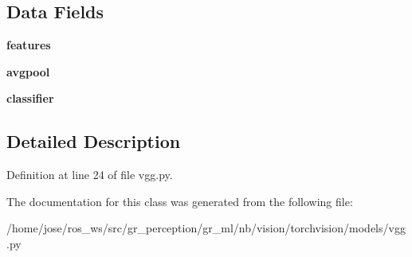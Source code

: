 \subsection*{Data Fields}
\begin{DoxyCompactItemize}
\item 
\mbox{\label{classtorchvision_1_1models_1_1vgg_1_1VGG_acf6b1606f61a6872ae78aa605631b8b4}} 
{\bfseries features}
\item 
\mbox{\label{classtorchvision_1_1models_1_1vgg_1_1VGG_ae55ee2975dba55cc195e5df2cd25a40b}} 
{\bfseries avgpool}
\item 
\mbox{\label{classtorchvision_1_1models_1_1vgg_1_1VGG_a5eadeb22a627ec76105524126766a510}} 
{\bfseries classifier}
\end{DoxyCompactItemize}


\subsection{Detailed Description}


Definition at line 24 of file vgg.\+py.



The documentation for this class was generated from the following file\+:\begin{DoxyCompactItemize}
\item 
/home/jose/ros\+\_\+ws/src/gr\+\_\+perception/gr\+\_\+ml/nb/vision/torchvision/models/vgg.\+py\end{DoxyCompactItemize}
